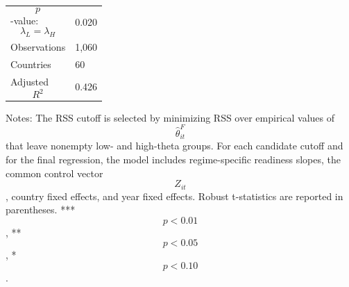 \begin{table}[H]
\begin{threeparttable}
\begin{tabularx}{\textwidth}{lY}
$$p$$-value: $$\lambda_L=\lambda_H$$ & 0.020 \\
Observations & 1,060 \\
Countries & 60 \\
Adjusted $$R^2$$ & 0.426 \\
\bottomrule
\end{tabularx}
\begin{tablenotes}[flushleft]\footnotesize
\item Notes: The RSS cutoff is selected by minimizing RSS over empirical values of $$\widehat{\theta}^{F}_{it}$$ that leave nonempty low- and high-theta groups. For each candidate cutoff and for the final regression, the model includes regime-specific readiness slopes, the common control vector $$Z_{it}$$, country fixed effects, and year fixed effects. Robust t-statistics are reported in parentheses. *** $$p<0.01$$, ** $$p<0.05$$, * $$p<0.10$$.
\end{tablenotes}
\end{threeparttable}
\end{table}

